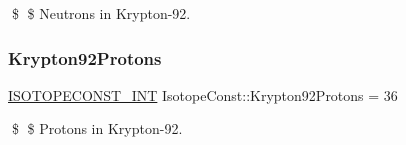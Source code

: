 \$ \$ Neutrons in Krypton-\/92. \mbox{\label{group___isotope_const-_krypton-_kr92_gac76b95e05fe58754a3c5f3fd30fd30dd}} 
\subsubsection{\texorpdfstring{Krypton92\+Protons}{Krypton92Protons}}
{\footnotesize\ttfamily \mbox{\hyperlink{group___isotope_const-_macros_ga5f18360b3e99483a35c32d789e62621c}{I\+S\+O\+T\+O\+P\+E\+C\+O\+N\+S\+T\+\_\+\+I\+NT}} Isotope\+Const\+::\+Krypton92\+Protons = 36}

\$ \$ Protons in Krypton-\/92. 